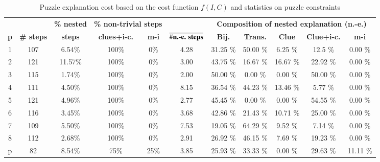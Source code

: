 	\begin{table}
		\centering
	\begin{tabular}{c|cc|cc|c|ccccc}
		  		&  		  				&  \textbf{\% nested}	& \multicolumn{2}{c|}{\textbf{\% non-trivial steps}}& \multicolumn{1}{c|}{}	& \multicolumn{5}{c}{\textbf{Composition of nested explanation (n.-e.)}} \\
	\textbf{p} &  \textbf{\# steps } 	&  \textbf{steps} 		& \textbf{clues+i-c.} 	& \textbf{m-i}  			&   \textbf{$\overline{ \# \text{\textbf{n.-e. steps}}}$}  							&  \textbf{Bij.} 	&   \textbf{Trans.} 	&  \textbf{Clue}  	&  \textbf{Clue+i-c.} 	&  \textbf{m-i} 	\\\hline
		1 &      					107 &       	 6.54\% 	&       100\% 			&     	0\% 				&    4.28 										&       31.25 \% 	&          50.00 \% 	&     6.25 \% 		&              12.5 \% 	&          0.00 \% 	\\
		2 &      					121 &       	11.57\% 	&       100\% 			&     	0\% 				&    3.00 										&       43.75 \% 	&         16.67 \% 		&    16.67 \% 		&             22.92 \% 	&         0.00 \% 	\\
		3 &      					115 &       	 1.74\% 	&       100\% 			&     	0\% 				&    2.00 										&       50.00 \%	&             0.00 \% 	&       0.00 \% 	&             50.00 \%  &           0.00 \% \\
		4 &      					111 &       	  4.50\% 	&       100\% 			&     	0\% 				&    8.15 										&       36.54 \% 	&         44.23 \% 		&    13.46 \% 		&              5.77 \% 	&         0.00 \% 	\\
		5 &      					121 &       	 4.96\% 	&       100\% 			&     	0\% 				&    2.77 										&       45.45 \% 	&             0.00 \% 	&       0.00 \% 	&             54.55 \% 	&          0.00 \% 	\\
		6 &      					116 &       	 3.45\% 	&       100\% 			&     	0\% 				&    3.68 										&       42.86 \% 	&         21.43 \% 		&    10.71 \% 		&             25.00 \%  &         0.00 \% 	\\
		7 &      					109 &       	  5.50\% 	&       100\% 			&     	0\% 				&    7.53 										&       19.05 \% 	&         64.29 \% 		&     9.52 \% 		&              7.14 \% 	&          0.00 \% 	\\
		8 &      					112 &       	 2.68\% 	&      	100\% 			&     	0\% 				&    2.91 										&       26.92 \% 	&         46.15 \% 		&     7.69 \% 		&             19.23 \% 	&           0.00 \% \\
		p &      					 82 &       	 8.54\% 	&      	75\% 			&     	25\%				&    3.85 										&       25.93 \% 	&         33.33 \% 		&        0.00 \% 	&             29.63 \% 	&       11.11 \% 
		\end{tabular}
		\caption{Puzzle explanation cost based on the cost function $f(I, C)$ and statistics on puzzle constraints}
		\label{table:sequence_leve}
		\end{table}


	